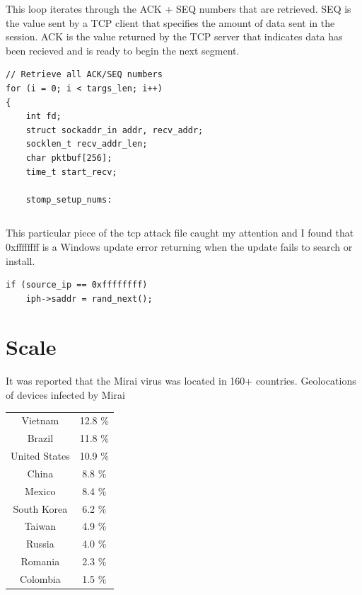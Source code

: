 \documentclass[12pt, letterpaper]{article}
\begin{document}
\begin{sloppypar}
\begin{flushleft}
\begin{verbatim}
\end{verbatim}



This loop iterates through the ACK + SEQ numbers that are retrieved. SEQ is the value
sent by a TCP client that specifies the amount of data sent in the session. ACK is the 
value returned by the TCP server that indicates data has been recieved and is ready to
begin the next segment. 
\begin{verbatim}
// Retrieve all ACK/SEQ numbers
for (i = 0; i < targs_len; i++)
{
    int fd;
    struct sockaddr_in addr, recv_addr;
    socklen_t recv_addr_len;
    char pktbuf[256];
    time_t start_recv;

    stomp_setup_nums:

\end{verbatim}


\begin{verbatim}

\end{verbatim}

This particular piece of the tcp attack file caught my attention and I found
that 0xffffffff is a Windows update error returning when the update fails to search
or install. 
\begin{verbatim}
if (source_ip == 0xffffffff)
	iph->saddr = rand_next();
\end{verbatim}

\end{flushleft}


\section*{Scale}
\begin{flushleft}
It was reported that the Mirai virus was located in 160+ countries.
Geolocations of devices infected by Mirai

\begin{center}
\begin{tabular}{c c}
Vietnam	& 12.8 \%\\
Brazil & 11.8 \%\\
United States & 10.9 \%\\
China & 8.8 \%\\
Mexico & 8.4 \%\\
South Korea	& 6.2 \%\\
Taiwan & 4.9 \%\\
Russia & 4.0 \%\\
Romania	& 2.3 \%\\
Colombia	 & 1.5 \%\\
\end{tabular}
\end{center}


\end{flushleft}
\end{sloppypar}
\end{document}
